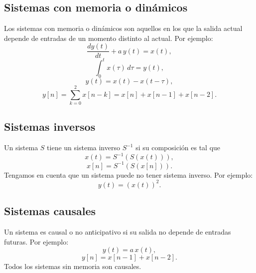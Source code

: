 \subsection{Sistemas con memoria o dinámicos}
Los sistemas con memoria o dinámicos son aquellos en los que la salida actual depende de entradas de un momento distinto al actual. Por ejemplo:
\begin{equation}
	\frac{dy(t)}{dt} + a \, y(t) = x(t),
\end{equation}
\begin{equation}
	\int_{0}^{t} x(\tau) \, d\tau = y(t),
\end{equation}
\begin{equation}
	y(t)=x(t)-x(t-\tau ),
\end{equation}
\begin{equation}
	y[n] = \sum_{k=0}^{2}x[n-k] = x[n] + x[n-1] + x[n-2].
\end{equation}

\subsection{Sistemas inversos}
Un sistema $S$ tiene un sistema inverso $S^{-1}$ si su composición es tal que
\begin{equation}
	x(t) = S^{-1}(S(x(t))),
\end{equation}
\begin{equation}
	x[n] = S^{-1}(S(x[n])).
\end{equation}
Tengamos en cuenta que un sistema puede no tener sistema inverso. Por ejemplo:
\begin{equation}
	y(t) = (x(t))^{2}.
\end{equation}

\subsection{Sistemas causales}
Un sistema es causal o no anticipativo si su salida no depende de entradas futuras. Por ejemplo:
\begin{equation}
	y(t) = a \, x(t),
\end{equation}
\begin{equation}
	y[n] = x[n-1] + x[n-2].
\end{equation}
Todos los sistemas sin memoria son causales.

